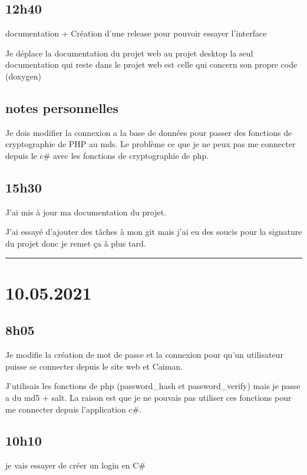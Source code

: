 \documentclass[a4paper,12pt,french]{sphinxmanual}
\begin{document}
\subsection{12h40}
\label{\detokenize{logbook:id86}}
\sphinxAtStartPar
documentation + Création d’une release pour pouvoir essayer l’interface

\sphinxAtStartPar
Je déplace la documentation du projet web au projet desktop la seul documentation qui reste dans le projet web est celle qui concern son propre code (doxygen)


\subsection{notes personnelles}
\label{\detokenize{logbook:id87}}
\sphinxAtStartPar
Je dois modifier la connexion a la base de données  pour passer des fonctions de cryptographie de PHP au mds. Le problème ce que je ne peux pas me connecter depuis le c\# avec les fonctions de cryptographie de php.


\subsection{15h30}
\label{\detokenize{logbook:id88}}
\sphinxAtStartPar
J’ai mis à jour ma documentation du projet.

\sphinxAtStartPar
J’ai essayé d’ajouter des tâches à mon git mais j’ai eu des soucis pour la signature du projet donc je remet ça à plus tard.


\bigskip\hrule\bigskip



\section{10.05.2021}
\label{\detokenize{logbook:id89}}

\subsection{8h05}
\label{\detokenize{logbook:id90}}
\sphinxAtStartPar
Je modifie la création de mot de passe et la connexion pour qu’un utilisateur puisse se connecter depuis le site web et Caiman.

\sphinxAtStartPar
J’utilisais les fonctions de php (password\_hash et password\_verify) mais je passe a du md5 + salt. La raison est que je ne pouvais pas utiliser ces fonctions pour me connecter depuis l’application c\#.


\subsection{10h10}
\label{\detokenize{logbook:id91}}
\sphinxAtStartPar
je vais essayer de créer un login en C\#
\end{document}
